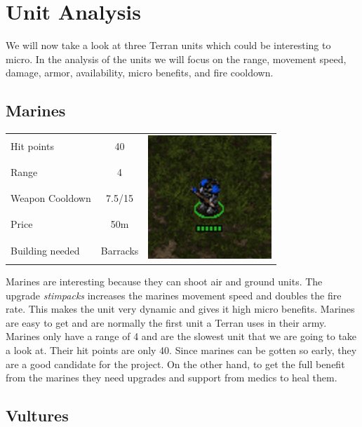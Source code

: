 \section{Unit Analysis}
We will now take a look at three Terran units which could be interesting to micro. In the analysis of the units we will
focus on the range, movement speed, damage, armor, availability, micro benefits, and fire cooldown. 

\subsection{Marines}
\begin{table}[H]
	\begin{tabular}{| l | c | c}
		\cline{1-2}	
		Hit points		& 40		&\multirow{5}{*}{\includegraphics[scale=.4]
									{Figures/Units/marine.png}} \\ \cline{1-2}
		Range			& 4 		&\\ \cline{1-2}
		Weapon Cooldown	& 7.5/15 	&\\ \cline{1-2}
		Price			& 50m		&\\ \cline{1-2}
		Building needed	& Barracks	&\\ \cline{1-2}
	\end{tabular}
\end{table}

Marines are interesting because they can shoot air and ground units. The upgrade \textit{stimpacks} increases the marines movement speed and doubles the fire rate. This makes the unit very dynamic and gives it high micro benefits. Marines are easy to get and are normally the first unit a Terran uses in
their army. Marines only have a range of 4 and are the slowest unit that we are going to take a look at. Their hit points are only 40. Since marines can be gotten so early, they are a good candidate for the project. On the other hand, to get the full benefit from the marines they need upgrades and support from medics to heal them. 

\subsection{Vultures}

